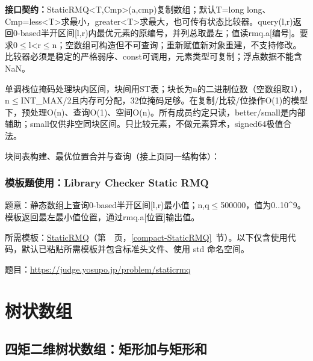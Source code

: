 {\sloppy{}\noindent\textbf{接口契约：}StaticRMQ<T,Cmp>(a,cmp)复制数组；默认T=long long、Cmp=less<T>求最小，greater<T>求最大，也可传有状态比较器。query(l,r)返回0-based半开区间[l,r)内最优元素的原编号，并列总取最左；值读rmq.a[编号]。要求0$\le$l<r$\le$n；空数组可构造但不可查询；重新赋值新对象重建，不支持修改。比较器必须是稳定的严格弱序、const可调用，元素类型可复制；浮点数据不能含NaN。

单调栈位掩码处理块内区间，块间用ST表；块长为n的二进制位数（空数组取1），n$\le$INT\_MAX/2且内存可分配，32位掩码足够。在复制/比较/位操作O(1)的模型下，预处理O(n)、查询O(1)、空间O(n)。所有成员约定只读，better/small是内部辅助；small仅供非空同块区间。只比较元素，不做元素算术，signed64极值合法。\par}

\Needspace{466pt}



\newpage

\noindent 块间表构建、最优位置合并与查询（接上页同一结构体）：



\Needspace{341pt}

\subsection*{模板题使用：Library Checker Static RMQ}

\label{usage-example-276}

题意：静态数组上查询0-based半开区间[l,r)最小值；n,q$\le$500000，值为0..10\textasciicircum{}9。模板返回最左最小值位置，通过rmq.a[位置]输出值。

所需模板：\hyperref[compact-StaticRMQ]{StaticRMQ}（第~\pageref{compact-StaticRMQ}~页，\ref{compact-StaticRMQ}~节）。以下仅含使用代码，默认已粘贴所需模板并包含标准头文件、使用 std 命名空间。

题目：\url{https://judge.yosupo.jp/problem/staticrmq}



\Needspace{180pt}

\chapter{树状数组}

\section{四矩二维树状数组：矩形加与矩形和}\label{compact-RectangleFenwick}

